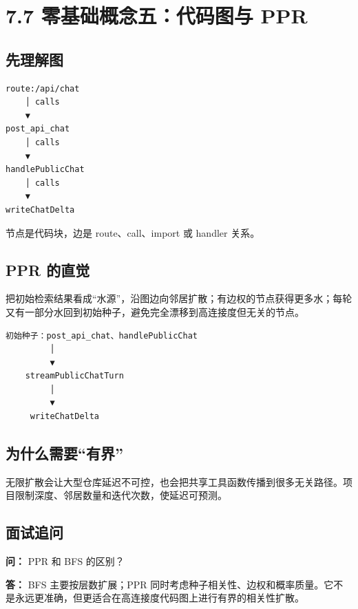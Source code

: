 \documentclass[UTF8,12pt,openany]{ctexbook}
\begin{document}
\section{7.7 零基础概念五：代码图与 PPR}

\subsection{先理解图}

\begin{lstlisting}
route:/api/chat
    │ calls
    ▼
post_api_chat
    │ calls
    ▼
handlePublicChat
    │ calls
    ▼
writeChatDelta
\end{lstlisting}

节点是代码块，边是 route、call、import 或 handler 关系。\par

\subsection{PPR 的直觉}

把初始检索结果看成“水源”，沿图边向邻居扩散；有边权的节点获得更多水；每轮又有一部分水回到初始种子，避免完全漂移到高连接度但无关的节点。\par

\begin{lstlisting}
初始种子：post_api_chat、handlePublicChat
         │
         ▼
    streamPublicChatTurn
         │
         ▼
     writeChatDelta
\end{lstlisting}

\subsection{为什么需要“有界”}

无限扩散会让大型仓库延迟不可控，也会把共享工具函数传播到很多无关路径。项目限制深度、邻居数量和迭代次数，使延迟可预测。\par

\subsection{面试追问}

\textbf{问：} PPR 和 BFS 的区别？\par

\textbf{答：} BFS 主要按层数扩展；PPR 同时考虑种子相关性、边权和概率质量。它不是永远更准确，但更适合在高连接度代码图上进行有界的相关性扩散。\par
\end{document}
